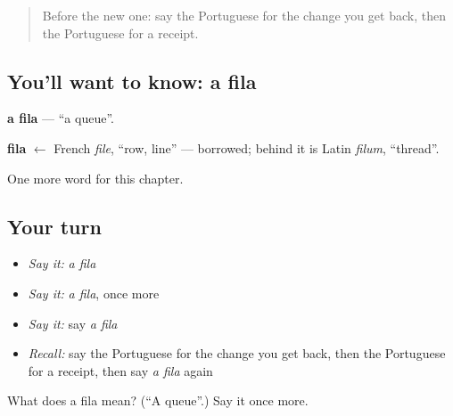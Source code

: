 \begin{quote}
Before the new one: say the Portuguese for the change you get back, then the Portuguese for a receipt.
\end{quote}

\subsection*{You'll want to know: a fila}
\textbf{a fila} — \textquotedblleft{}a queue\textquotedblright{}.

\begin{cousinweb}
\textbf{fila} $\leftarrow$ French \emph{file}, \textquotedblleft{}row, line\textquotedblright{} — borrowed; behind it is Latin \emph{filum}, \textquotedblleft{}thread\textquotedblright{}.
\end{cousinweb}

\begin{grammarlens}[title={What you've built}]
One more word for this chapter.
\end{grammarlens}

\subsection*{Your turn}
\begin{itemize}
\raggedright
  \item \emph{Say it:} \emph{a fila}
  \item \emph{Say it:} \emph{a fila}, once more
  \item \emph{Say it:} say \emph{a fila}
  \item \emph{Recall:} say the Portuguese for the change you get back, then the Portuguese for a receipt, then say \emph{a fila} again
\end{itemize}

\begin{tcolorbox}[breakable,colback=teal!4,colframe=teal!35!black,title={Before you move on}]
What does a fila mean? (\textquotedblleft{}A queue\textquotedblright{}.) Say it once more.
\end{tcolorbox}
